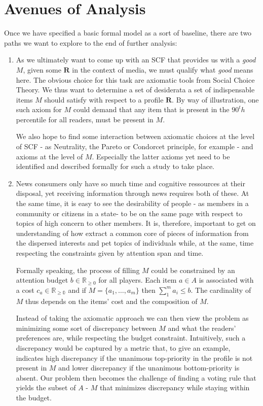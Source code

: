 \documentclass[10pt,a4paper, english]{article}
\begin{document}
\section{Avenues of Analysis}
Once we have specified a basic formal model as a sort of baseline, there are two paths we want to explore to the end of further analysis:
\begin{enumerate}
\item As we ultimately want to come up with an SCF that provides us with a \textit{good} $M$, given some $\mathbf{R}$ in the context of media, we must qualify what \textit{good} means here. The obvious choice for this task are axiomatic tools from Social Choice Theory. We thus want to determine a set of desiderata a set of indispensable items $M$ should satisfy with respect to a profile $\mathbf{R}$. By way of illustration, one such axiom for $M$ could demand that any item that is present in the $90^th$ percentile for all readers, must be present in $M$.

We also hope to find some interaction between axiomatic choices at the level of SCF - as Neutrality, the Pareto or Condorcet principle, for example - and axioms at the level of $M$. Especially the latter axioms yet need to be identified and described formally for such a study to take place.
\item News consumers only have so much time and cognitive ressources at their disposal, yet receiving information through news requires both of these. At the same time, it is easy to see the desirability of people - as members in a community or citizens in a state- to be on the same page with respect to topics of high concern to other members. It is, therefore, important to get on understanding of how extract a common core of pieces of information from the dispersed interests and pet topics of individuals while, at the same, time respecting the constraints given by attention span and time.

Formally speaking, the process of filling $M$ could be constrained by an attention budget $b\in \mathbb{R}_{\geq 0}$ for all players. Each item $a\in A$ is associated with a cost $c_a\in \mathbb{R_{\geq 0}}$ and if $M=\{a_1, \dots ,a_m\}$ then $\sum_1^m a_i \leq b$. The cardinality of $M$ thus depends on the items' cost and the composition of $M$.

Instead of taking the axiomatic approach we can then view the problem as minimizing some sort of discrepancy between $M$ and what the readers' preferences are, while respecting the budget constraint. Intuitively, such a discrepancy would be captured by a metric that, to give an example, indicates high discrepancy if the unanimous top-priority in the profile is not present in $M$ and lower discrepancy if the unanimous bottom-priority is absent. Our problem then becomes the challenge of finding a voting rule that yields the subset of $A$ - $M$ that minimizes discrepancy while staying within the budget.


\end{enumerate}
\end{document}
